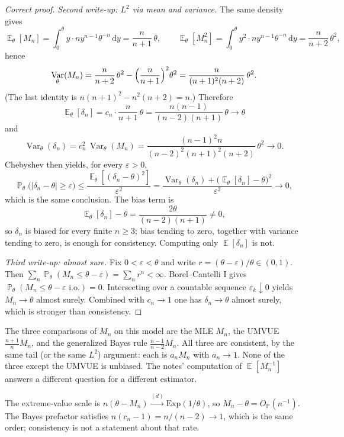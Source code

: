 \documentclass[11pt,a4paper]{article}
\DeclareMathOperator{\Var}{Var}
\DeclareMathOperator{\E}{\mathbb{E}}
\DeclareMathOperator{\Pbb}{\mathbb{P}}
\begin{document}
\begin{proof}[Correct proof]
\emph{Second write-up: \( L^{2} \) via mean and variance.}
The same density gives
\[
\E_\theta[M_n]
=
\int_{0}^{\theta} y\cdot n y^{n-1}\theta^{-n}\,\mathrm{d}y
=
\frac{n}{n+1}\,\theta,
\qquad
\E_\theta[M_n^{2}]
=
\int_{0}^{\theta} y^{2}\cdot n y^{n-1}\theta^{-n}\,\mathrm{d}y
=
\frac{n}{n+2}\,\theta^{2},
\]
hence
\[
\Var_\theta(M_n)
=
\frac{n}{n+2}\,\theta^{2}
-
\Bigl(\frac{n}{n+1}\Bigr)^{2}\theta^{2}
=
\frac{n}{(n+1)^{2}(n+2)}\,\theta^{2}.
\]
(The last identity is \( n(n+1)^{2}-n^{2}(n+2)=n \).) Therefore
\[
\E_\theta[\delta_n]
=
c_n\cdot\frac{n}{n+1}\,\theta
=
\frac{n(n-1)}{(n-2)(n+1)}\,\theta
\to
\theta
\]
and
\[
\Var_\theta(\delta_n)
=
c_n^{2}\,\Var_\theta(M_n)
=
\frac{(n-1)^{2}n}{(n-2)^{2}(n+1)^{2}(n+2)}\,\theta^{2}
\to
0.
\]
Chebyshev then yields, for every \( \varepsilon>0 \),
\[
\Pbb_\theta\bigl(|\delta_n-\theta|\ge\varepsilon\bigr)
\le
\frac{\E_\theta[(\delta_n-\theta)^{2}]}{\varepsilon^{2}}
=
\frac{\Var_\theta(\delta_n)+\bigl(\E_\theta[\delta_n]-\theta\bigr)^{2}}{\varepsilon^{2}}
\to 0,
\]
which is the same conclusion. The bias term is
\[
\E_\theta[\delta_n]-\theta
=
\frac{2\theta}{(n-2)(n+1)}
\neq
0,
\]
so \( \delta_n \) is biased for every finite \( n\ge 3 \); bias tending to zero, together with variance tending to zero, is enough for consistency. Computing only \( \E[\delta_n] \) is not.

\emph{Third write-up: almost sure.}
Fix \( 0<\varepsilon<\theta \) and write \( r=(\theta-\varepsilon)/\theta\in(0,1) \). Then \( \sum_{n}\Pbb_\theta(M_n\le\theta-\varepsilon)=\sum_{n}r^{n}<\infty \). Borel--Cantelli I gives \( \Pbb_\theta(M_n\le\theta-\varepsilon\text{ i.o.})=0 \). Intersecting over a countable sequence \( \varepsilon_k\downarrow 0 \) yields \( M_n\to\theta \) almost surely. Combined with \( c_n\to 1 \) one has \( \delta_n\to\theta \) almost surely, which is stronger than consistency.
\end{proof}

\begin{remark}
\label{rem:p7-bias}
The three comparisons of \( M_n \) on this model are the MLE \( M_n \), the UMVUE \( \frac{n+1}{n}M_n \), and the generalized Bayes rule \( \frac{n-1}{n-2}M_n \). All three are consistent, by the same tail (or the same \( L^{2} \)) argument: each is \( a_n M_n \) with \( a_n\to 1 \). None of the three except the UMVUE is unbiased. The notes' computation of \( \E[M_n^{-1}] \) answers a different question for a different estimator.

The extreme-value scale is \( n(\theta-M_n)\xrightarrow{(d)}\mathrm{Exp}(1/\theta) \), so \( M_n-\theta=O_{\Pbb}(n^{-1}) \). The Bayes prefactor satisfies \( n(c_n-1)=n/(n-2)\to 1 \), which is the same order; consistency is not a statement about that rate.
\end{remark}
\end{document}
